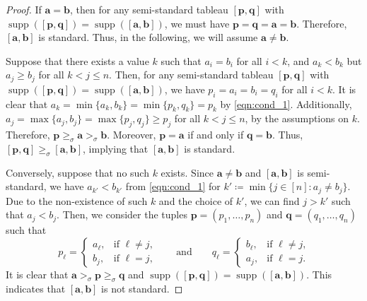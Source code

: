 \documentclass[11pt,a4paper,reqno,dvipsnames]{amsart}
\theoremstyle{plain}
\theoremstyle{definition}
\newtheorem{Assumptions and Discussion}[Theorem]{Assumptions and Discussion}
\theoremstyle{remark}
\def\supp{\operatorname{supp}}
\newcommand\bda{{\bm a}}
\newcommand\bdb{{\bm b}}
\newcommand\bdp{{\bm p}}
\newcommand\bdq{{\bm q}}
\begin{document}
\begin{proof}
    If $\bda=\bdb$, then for any semi-standard tableau $[\bdp,\bdq]$ with $\supp ([\bdp,\bdq])=\supp([\bda,\bdb])$, we must have $\bdp=\bdq=\bda=\bdb$. Therefore, $[\bda,\bdb]$ is standard. Thus, in the following, we will assume $\bda\neq \bdb$.

    Suppose that there exists a value $k$ such that $a_{i}=b_{i}$ for all $i<k$, and $a_k<b_{k}$ but $  a_{j}\geq b_j$ for all $k<j\leq n$. Then, for any semi-standard tableau $[\bdp,\bdq]$ with $\supp ([\bdp,\bdq])=\supp([\bda,\bdb])$, we have $p_i=a_{i}=b_{i}=q_i$ for all $i<k$. It is clear that $a_k=\min\{a_k,b_k\}=\min\{p_k,q_k\}=p_k$ by \eqref{eqn:cond_1}. Additionally, $a_j = \max\{a_j,b_j\} =\max\{p_j,q_j\}\ge p_j$ for all $k<j\leq n$, by the assumptions on $k$. Therefore, $\bdp \geq_{\sigma} \bda >_{\sigma} \bdb$. Moreover, $\bdp=\bda$ if and only if $\bdq=\bdb$. Thus, $[\bdp,\bdq] \geq_{\sigma} [\bda,\bdb]$, implying that $[\bda,\bdb]$ is standard.

    Conversely, suppose that no such $k$ exists. 
    Since $\bda\ne \bdb$ and $[\bda,\bdb]$ is semi-standard, we have $a_{k'}<b_{k'}$ from \eqref{eqn:cond_1} for $k'\coloneqq \min\{j\in [n]:a_j\ne b_j\}$. Due to the non-existence of such $k$ and the choice of $k'$, we can find $j>k'$ such that $a_j<b_j$. Then, we  consider the tuples $\bdp=(p_1,\ldots, p_{n})$ and $\bdq=(q_1,\ldots, q_{n})$ such that 
    \[
        p_\ell=
        \begin{cases}
            a_{\ell}, & \text{if $\ell\ne j$,} \\
            b_j, & \text{if $\ell=j$,}
        \end{cases}
        \qquad \text{and} \qquad
        q_\ell=
        \begin{cases}
            b_{\ell}, & \text{if $\ell\ne j$,} \\
            a_j, & \text{if $\ell=j$.}
        \end{cases}
    \]
    It is clear that $\bda>_{\sigma}\bdp \ge_{\sigma} \bdq$ and $\supp ([\bdp,\bdq])=\supp([\bda,\bdb])$. 
    This indicates that $[\bda,\bdb]$ is not standard.
\end{proof}
\end{document}
